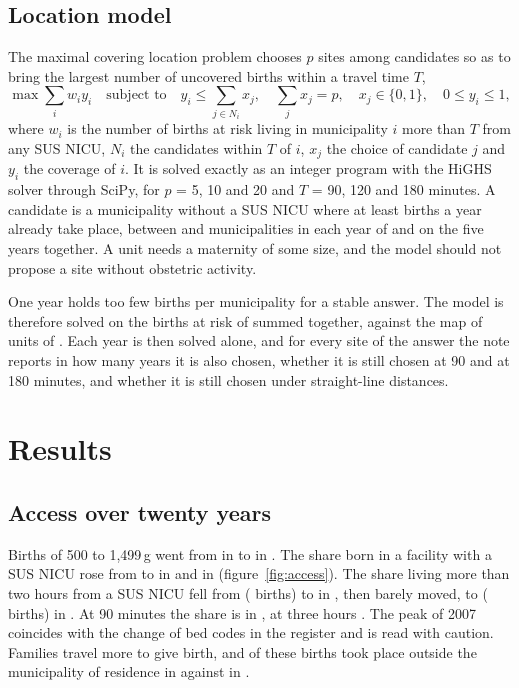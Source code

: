 \documentclass[11pt,a4paper]{article}
\begin{document}
\subsection{Location model}
The maximal covering location problem chooses $p$ sites among candidates so as to
bring the largest number of uncovered births within a travel time $T$,
\[
\max \sum_i w_i y_i \quad \text{subject to} \quad
y_i \le \sum_{j \in N_i} x_j, \quad \sum_j x_j = p, \quad
x_j \in \{0,1\}, \quad 0 \le y_i \le 1,
\]
where $w_i$ is the number of births at risk living in municipality $i$ more than
$T$ from any SUS NICU, $N_i$ the candidates within $T$ of $i$, $x_j$ the choice of
candidate $j$ and $y_i$ the coverage of $i$. It is solved exactly as an integer
program with the HiGHS solver through SciPy, for $p$ = 5, 10 and 20 and $T$ = 90,
120 and 180 minutes. A candidate is a municipality without a SUS NICU where at
least \minBirths{} births a year already take place, between \candidatesMin{} and
\candidatesMax{} municipalities in each year of \pooledYears{} and \candidates{}
on the five years together. A unit needs a maternity of some size, and the model
should not propose a site without obstetric activity.

One year holds too few births per municipality for a stable answer. The model is
therefore solved on the births at risk of \pooledYears{} summed together, against
the map of units of \lastYear. Each year is then solved alone, and for every site
of the answer the note reports in how many years it is also chosen, whether it is
still chosen at 90 and at 180 minutes, and whether it is still chosen under
straight-line distances.

\section{Results}

\subsection{Access over twenty years}
Births of 500 to 1,499\,g went from \riskFirst{} in \firstYear{} to \riskLast{} in
\lastYear. The share born in a facility with a SUS NICU rose from \bornFirst{} to
\bornMid{} in \midYear{} and \bornLast{} in \lastYear{}
(figure~\ref{fig:access}). The share living more than two hours from a SUS NICU
fell from \overFirst{} (\overBirthsFirst{} births) to \overMid{} in \midYear, then
barely moved, to \overLast{} (\overBirthsLast{} births) in \lastYear. At 90
minutes the share is \overNinetyLast{} in \lastYear, at three hours
\overOneEightyLast. The peak of 2007 coincides with the change of bed codes in
the register and is read with caution. Families travel more to give birth, and
\outsideFirst{} of these births took place outside the municipality of residence
in \firstYear{} against \outsideLast{} in \lastYear.
\end{document}
